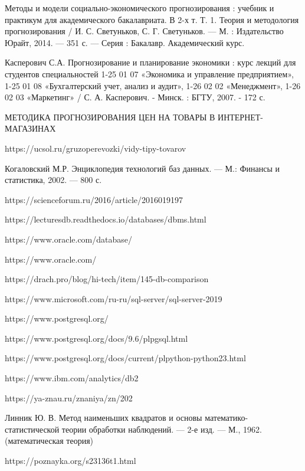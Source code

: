 \documentclass[a4paper,14pt]{extreport}
\begin{document}
\begin{thebibliography}{3}
	 Методы и модели социально-экономического прогнозирования : учебник и практикум для академического бакалавриата. В 2-х т. Т. 1. Теория и методология прогнозирования / И. С. Светуньков, С. Г. Светуньков. — М. : Издательство Юрайт, 2014. — 351 с. — Серия : Бакалавр. Академический курс.
	
	 Касперович С.А. Прогнозирование и планирование экономики : курс лекций для студентов специальностей 1-25 01 07 «Экономика и управление предприятием», 1-25 01 08 «Бухгалтерский учет, анализ и аудит», 1-26 02 02 «Менеджмент», 1-26 02 03 «Маркетинг» / С. А. Касперович. - Минск. : БГТУ, 2007. - 172 с. 
	
	 МЕТОДИКА ПРОГНОЗИРОВАНИЯ ЦЕН НА ТОВАРЫ В ИНТЕРНЕТ-МАГАЗИНАХ
	
	 https://ucsol.ru/gruzoperevozki/vidy-tipy-tovarov
	
	 Когаловский М.Р. Энциклопедия технологий баз данных. — М.: Финансы и статистика, 2002. — 800 с.
	
	 https://scienceforum.ru/2016/article/2016019197
	
	 https://lecturesdb.readthedocs.io/databases/dbms.html
	
	 https://www.oracle.com/database/
	
	 https://www.oracle.com/
	
	 https://drach.pro/blog/hi-tech/item/145-db-comparison
	
	 https://www.microsoft.com/ru-ru/sql-server/sql-server-2019
	
	 https://www.postgresql.org/
	
	 https://www.postgresql.org/docs/9.6/plpgsql.html
	
	 https://www.postgresql.org/docs/current/plpython-python23.html
	
	 https://www.ibm.com/analytics/db2
	
	 https://ya-znau.ru/znaniya/zn/202
	
	 Линник Ю. В. Метод наименьших квадратов и основы математико-статистической теории обработки наблюдений. — 2-е изд. — М., 1962. (математическая теория)
	
	 https://poznayka.org/s23136t1.html
\end{thebibliography}
	
\end{document}
